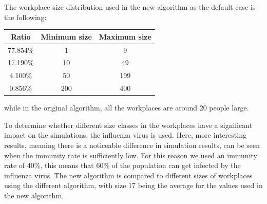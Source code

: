 \documentclass[runningheads]{llncs}
\begin{document}
The workplace size distribution used in the new algorithm as the default case is the following:
\begin{table}[!h]
	\centering
	\begin{tabular}{|c|c|c|}
		\hline
		Ratio & Minimum size & Maximum size \\\hline
		77.854\% & 1 & 9 \\\hline
		17.190\% & 10 & 49 \\\hline
		4.100\% & 50 & 199 \\\hline
		0.856\% & 200 & 400 \\\hline
	\end{tabular}
\end{table}

while in the original algorithm, all the workplaces are around 20 people large.

To determine whether different size classes in the workplaces have a significant impact on the simulations, the influenza virus is used.
Here, more interesting results, meaning there is a noticeable difference in simulation results, can be seen when the immunity rate is sufficiently low. For this reason we used an immunity rate of 40\%, this means that 60\% of the population can get infected by the influenza virus.
The new algorithm is compared to different sizes of workplaces using the different algorithm, with size 17 being the average for the values used in the new algorithm.
\end{document}
